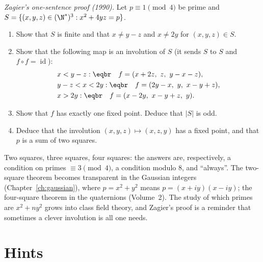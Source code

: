 \begin{exercise}[$\star\star\star$]\label{ex:zagier}
\emph{Zagier's one-sentence proof (1990).} Let $p\equiv1\pmod4$ be prime and $S=\{(x,y,z)\in(\N^*)^3:x^2+4yz=p\}$.
\begin{enumerate}[label=(\alph*)]
\item Show that $S$ is finite and that $x\ne y-z$ and $x\ne2y$ for $(x,y,z)\in S$.
\item Show that the following map is an involution of $S$ (it sends $S$ to $S$ and $f\circ f=\operatorname{id}$):
\[
\begin{aligned}&x<y-z:\eqbr\quad f=(x+2z,\ z,\ y-x-z),\\&y-z<x<2y:\eqbr\quad f=(2y-x,\ y,\ x-y+z),\\&x>2y:\eqbr\quad f=(x-2y,\ x-y+z,\ y).\end{aligned}
\]
\item Show that $f$ has exactly one fixed point. Deduce that $|S|$ is odd.
\item Deduce that the involution $(x,y,z)\mapsto(x,z,y)$ has a fixed point, and that $p$ is a sum of two squares.
\end{enumerate}
\end{exercise}

\begin{beauty}
Two squares, three squares, four squares: the answers are, respectively, a condition on primes $\equiv3\pmod4$, a condition modulo $8$, and ``always''. The two-square theorem becomes transparent in the Gaussian integers (Chapter~\ref{ch:gaussian}), where $p=x^2+y^2$ means $p=(x+iy)(x-iy)$; the four-square theorem in the quaternions (Volume~2). The study of which primes are $x^2+ny^2$ grows into class field theory, and Zagier's proof is a reminder that sometimes a clever involution is all one needs.
\end{beauty}

\section{Hints}

